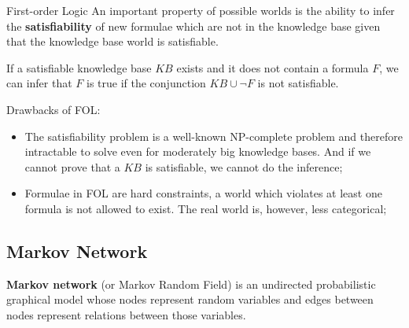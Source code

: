 \documentclass{beamer}
\begin{document}
\begin{frame}[fragile]{First-order Logic}
An important property of possible worlds is the ability to infer the
\textbf{satisfiability} of new formulae which are not in the knowledge
base given that the knowledge base world is satisfiable.\vspace{0.5cm}

If a satisfiable knowledge base $KB$ exists and it does not contain a
formula $F$, we can infer that $F$ is true if the conjunction $KB \cup
\neg F$ is not satisfiable.
\end{frame}

\begin{frame}{\insertsubsection}
Drawbacks of FOL:
\begin{itemize}
  \item The satisfiability problem is a well-known NP-complete problem
    and therefore intractable to solve even for moderately big
    knowledge bases.  And if we cannot prove that a $KB$ is
    satisfiable, we cannot do the inference;

  \item Formulae in FOL are hard constraints, a world which violates
    at least one formula is not allowed to exist.  The real world is,
    however, less categorical; 
\end{itemize}
\end{frame}

\subsection{Markov Network}
\begin{frame}{\insertsubsection}
  \begin{definition}
    \textbf{Markov network} (or Markov Random Field) is an undirected
    probabilistic graphical model whose nodes represent random
    variables and edges between nodes represent relations between
    those variables.
  \end{definition}
  \begin{example}
    \begin{center}
    \end{center}
  \end{example}
\end{frame}
\end{document}
